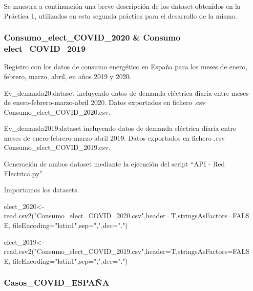 \documentclass[
]{article}
\newenvironment{Shaded}{\begin{snugshade}}{\end{snugshade}}
\newcommand{\DataTypeTok}[1]{\textcolor[rgb]{0.87,0.87,0.75}{#1}}
\newcommand{\DecValTok}[1]{\textcolor[rgb]{0.86,0.86,0.80}{#1}}
\newcommand{\KeywordTok}[1]{\textcolor[rgb]{0.94,0.87,0.69}{#1}}
\newcommand{\NormalTok}[1]{\textcolor[rgb]{0.80,0.80,0.80}{#1}}
\newcommand{\OtherTok}[1]{\textcolor[rgb]{0.94,0.94,0.56}{#1}}
\newcommand{\StringTok}[1]{\textcolor[rgb]{0.80,0.58,0.58}{#1}}
\begin{document}
Se muestra a continuación una breve descripción de los dataset obtenidos
en la Práctica 1, utilizados en esta segunda práctica para el desarrollo
de la misma.

\hypertarget{consumo_elect_covid_2020-consumo-elect_covid_2019}{%
\subsubsection{Consumo\_elect\_COVID\_2020 \& Consumo
elect\_COVID\_2019}\label{consumo_elect_covid_2020-consumo-elect_covid_2019}}

Registro con los datos de consumo energético en España para los meses de
enero, febrero, marzo, abril, en años 2019 y 2020.

Ev\_demanda20:dataset incluyendo datos de demanda eléctrica diaria entre
meses de enero-febrero-marzo-abril 2020. Datos exportados en fichero
.csv Consumo\_elect\_COVID\_2020.csv.

Ev\_demanda2019:dataset incluyendo datos de demanda eléctrica diaria
entre meses de enero-febrero-marzo-abril 2019. Datos exportados en
fichero .csv Consumo\_elect\_COVID\_2019.csv.

Generación de ambos dataset mediante la ejecución del script ``API - Red
Electrica.py''

Importamos los datasets.

\begin{Shaded}
\begin{Highlighting}[]
\NormalTok{elect_}\DecValTok{2020}\NormalTok{<-}\KeywordTok{read.csv2}\NormalTok{(}\StringTok{"Consumo_elect_COVID_2020.csv"}\NormalTok{,}\DataTypeTok{header=}\NormalTok{T,}\DataTypeTok{stringsAsFactors=}\OtherTok{FALSE}\NormalTok{, }\DataTypeTok{fileEncoding=}\StringTok{"latin1"}\NormalTok{,}\DataTypeTok{sep=}\StringTok{","}\NormalTok{,}\DataTypeTok{dec=}\StringTok{"."}\NormalTok{)}

\NormalTok{elect_}\DecValTok{2019}\NormalTok{<-}\KeywordTok{read.csv2}\NormalTok{(}\StringTok{"Consumo_elect_COVID_2019.csv"}\NormalTok{,}\DataTypeTok{header=}\NormalTok{T,}\DataTypeTok{stringsAsFactors=}\OtherTok{FALSE}\NormalTok{, }\DataTypeTok{fileEncoding=}\StringTok{"latin1"}\NormalTok{,}\DataTypeTok{sep=}\StringTok{","}\NormalTok{,}\DataTypeTok{dec=}\StringTok{"."}\NormalTok{)}
\end{Highlighting}
\end{Shaded}

\hypertarget{casos_covid_espauxf1a}{%
\subsubsection{Casos\_COVID\_ESPAÑA}\label{casos_covid_espauxf1a}}
\end{document}
